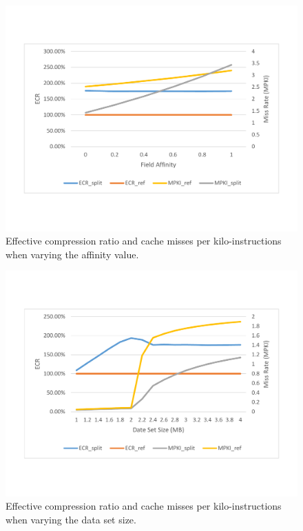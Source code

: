 \begin{figure}[htb]
\centering
\includegraphics[trim=0mm 0mm 0mm 0mm,clip,width=1\linewidth]{figs/figure.pdf}
\caption{Effective compression ratio and cache misses per kilo-instructions when varying the affinity value.}
\label{fig:bla}
\end{figure}

\begin{figure}[htb]
\centering
\includegraphics[trim=0mm 0mm 0mm 0mm,clip,width=1\linewidth]{figs/figure2.pdf}
\caption{Effective compression ratio and cache misses per kilo-instructions when
varying the data set size.}
\label{fig:bla2}
\end{figure}

